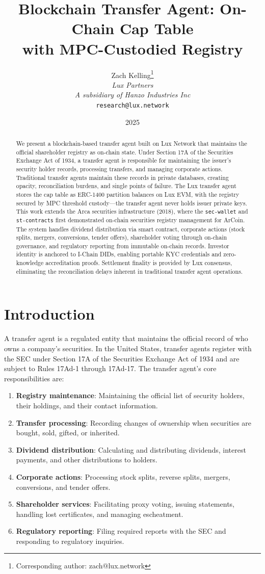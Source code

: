 \documentclass[11pt,a4paper]{article}
\title{Blockchain Transfer Agent: On-Chain Cap Table\\with MPC-Custodied Registry}
\author{
Zach Kelling\thanks{Corresponding author: zach@lux.network}\\
\textit{Lux Partners}\\
\textit{A subsidiary of Hanzo Industries Inc}\\
\texttt{research@lux.network}
}
\date{2025}
\begin{document}
\luxcoverpage

\begin{abstract}
We present a blockchain-based transfer agent built on Lux Network that maintains the official shareholder registry as on-chain state. Under Section 17A of the Securities Exchange Act of 1934, a transfer agent is responsible for maintaining the issuer's security holder records, processing transfers, and managing corporate actions. Traditional transfer agents maintain these records in private databases, creating opacity, reconciliation burdens, and single points of failure. The Lux transfer agent stores the cap table as ERC-1400 partition balances on Lux EVM, with the registry secured by MPC threshold custody---the transfer agent never holds issuer private keys. This work extends the Arca securities infrastructure (2018), where the \texttt{sec-wallet} and \texttt{st-contracts} first demonstrated on-chain securities registry management for ArCoin. The system handles dividend distribution via smart contract, corporate actions (stock splits, mergers, conversions, tender offers), shareholder voting through on-chain governance, and regulatory reporting from immutable on-chain records. Investor identity is anchored to I-Chain DIDs, enabling portable KYC credentials and zero-knowledge accreditation proofs. Settlement finality is provided by Lux consensus, eliminating the reconciliation delays inherent in traditional transfer agent operations.
\end{abstract}

\section{Introduction}

A transfer agent is a regulated entity that maintains the official record of who owns a company's securities. In the United States, transfer agents register with the SEC under Section 17A of the Securities Exchange Act of 1934 and are subject to Rules 17Ad-1 through 17Ad-17. The transfer agent's core responsibilities are:

\begin{enumerate}[nosep]
  \item \textbf{Registry maintenance}: Maintaining the official list of security holders, their holdings, and their contact information.
  \item \textbf{Transfer processing}: Recording changes of ownership when securities are bought, sold, gifted, or inherited.
  \item \textbf{Dividend distribution}: Calculating and distributing dividends, interest payments, and other distributions to holders.
  \item \textbf{Corporate actions}: Processing stock splits, reverse splits, mergers, conversions, and tender offers.
  \item \textbf{Shareholder services}: Facilitating proxy voting, issuing statements, handling lost certificates, and managing escheatment.
  \item \textbf{Regulatory reporting}: Filing required reports with the SEC and responding to regulatory inquiries.
\end{enumerate}
\end{document}
